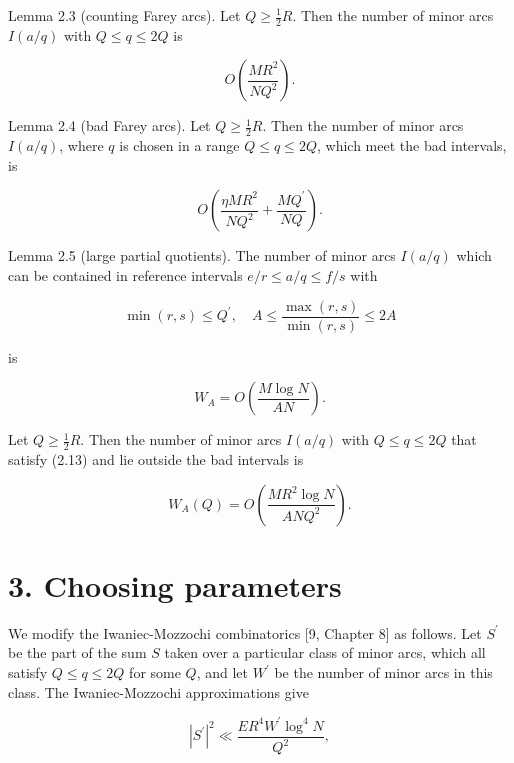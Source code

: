 \documentclass[10pt]{article}
\begin{document}
Lemma 2.3 (counting Farey arcs). Let $Q \geqslant \frac{1}{2} R$. Then the number of minor arcs $I(a / q)$ with $Q \leqslant q \leqslant 2 Q$ is


\begin{equation*}
O\left(\frac{M R^{2}}{N Q^{2}}\right). \tag{2.11}
\end{equation*}


Lemma 2.4 (bad Farey arcs). Let $Q \geqslant \frac{1}{2} R$. Then the number of minor arcs $I(a / q)$, where $q$ is chosen in a range $Q \leqslant q \leqslant 2 Q$, which meet the bad intervals, is


\begin{equation*}
O\left(\frac{\eta M R^{2}}{N Q^{2}}+\frac{M Q^{\prime}}{N Q}\right). \tag{2.12}
\end{equation*}


Lemma 2.5 (large partial quotients). The number of minor arcs $I(a / q)$ which can be contained in reference intervals $e / r \leqslant a / q \leqslant f / s$ with


\begin{equation*}
\min (r, s) \leqslant Q^{\prime}, \quad A \leqslant \frac{\max (r, s)}{\min (r, s)} \leqslant 2 A \tag{2.13}
\end{equation*}


is


\begin{equation*}
W_{A}=O\left(\frac{M \log N}{A N}\right). \tag{2.14}
\end{equation*}


Let $Q \geqslant \frac{1}{2} R$. Then the number of minor arcs $I(a / q)$ with $Q \leqslant q \leqslant 2 Q$ that satisfy (2.13) and lie outside the bad intervals is


\begin{equation*}
W_{A}(Q)=O\left(\frac{M R^{2} \log N}{A N Q^{2}}\right). \tag{2.15}
\end{equation*}


\section*{3. Choosing parameters}
We modify the Iwaniec-Mozzochi combinatorics [9, Chapter 8] as follows. Let $S^{\prime}$ be the part of the sum $S$ taken over a particular class of minor arcs, which all satisfy $Q \leqslant q \leqslant 2 Q$ for some $Q$, and let $W^{\prime}$ be the number of minor arcs in this class. The Iwaniec-Mozzochi approximations give


\begin{equation*}
\left|S^{\prime}\right|^{2} \ll \frac{E R^{4} W^{\prime} \log ^{4} N}{Q^{2}}, \tag{3.1}
\end{equation*}
\end{document}
